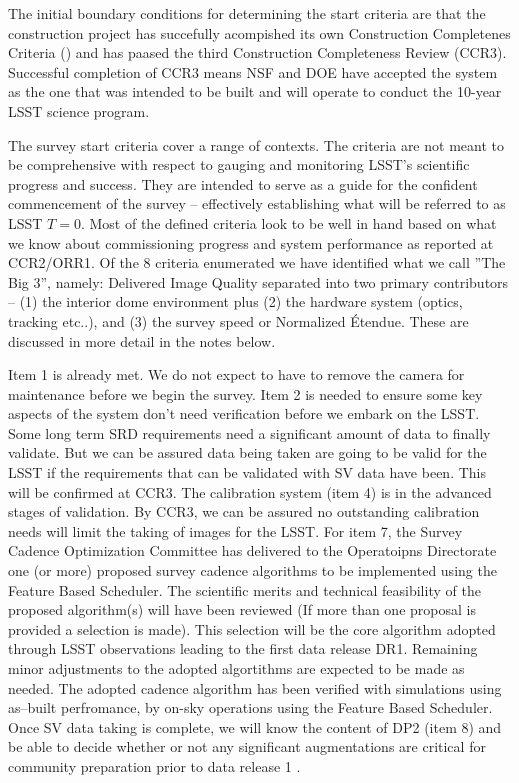 The initial boundary conditions for determining the start criteria are that the construction project has succefully acompished its own Construction Completenes Criteria (\cite{SITCOMTN-005}) and has paased the third Construction Completeness Review (CCR3).  Successful completion of CCR3 means NSF and DOE have accepted the system as the one that was intended to be built and will operate to conduct the 10-year LSST science program.  

The survey start criteria cover a range of contexts.  The criteria are not meant to be comprehensive with respect to gauging and monitoring LSST's scientific progress and success. They are intended to serve as a guide for the confident commencement of the survey -- effectively establishing what will be referred to as LSST $T=0$.  Most of the defined criteria look to be well in hand based on what we know about commissioning progress and system performance as reported at CCR2/ORR1.  Of the 8 criteria enumerated we have identified what we call ''The Big 3'', namely: Delivered Image Quality separated into two primary contributors -- (1) the interior dome environment plus (2) the hardware system (optics, tracking etc..), and (3) the survey speed or Normalized \'{E}tendue. These are discussed in more detail in the notes below.

Item 1 is already met. We do not expect to have to remove the camera for maintenance before we begin the survey. Item 2 is needed to ensure some key aspects of the system don't need verification before we embark on the LSST. Some long term SRD requirements need a significant amount of data to finally validate. But we can be assured data being taken are going to be valid for the LSST if the requirements that can be validated with SV data have been. This will be confirmed at CCR3. The calibration system (item 4)  is in the advanced stages of validation. By CCR3, we can be assured no outstanding calibration needs will limit the taking of images for the LSST. For item 7, the Survey Cadence Optimization Committee has delivered to the Operatoipns Directorate one (or more) proposed survey cadence algorithms to be implemented using the Feature Based Scheduler.  The scientific merits and technical feasibility of the proposed algorithm(s) will have been reviewed (If more than one proposal is provided a selection is made).  This selection will be the core algorithm adopted through LSST observations leading to the first data release DR1.  Remaining minor adjustments to the adopted algortithms are expected to be made as needed.  The adopted cadence algorithm has been verified with simulations using as--built perfromance, by on-sky operations using the Feature Based Scheduler.  Once SV data taking is complete, we will know the content of DP2 (item 8) and be able to decide whether or not any significant augmentations are critical for community preparation prior to data release 1 \citep[DR1; see][]{RTN-011}. 

